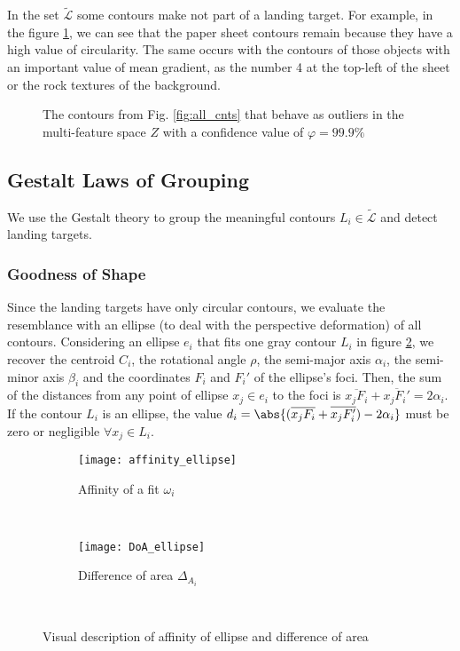 In the set $\widetilde{\mathcal{L}}$ some contours make not part of a landing target. For example, in the figure \ref{fig:rx_cnts}, we can see that the paper sheet contours remain because they have a high value of circularity. The same occurs with the contours of those objects with an important value of mean gradient, as the number 4 at the top-left of the sheet or the rock textures of the background.
\begin{figure}[h]
    \centering
    \caption{The contours from Fig. \ref{fig:all_cnts} that behave as outliers in the multi-feature space $Z$ with a confidence value of $\varphi=99.9\%$}
    \label{fig:rx_cnts}
\end{figure}

\subsection{Gestalt Laws of Grouping}\label{subsec:Gestalt}
We use the Gestalt theory \citep{Wertheimer:Psycologische:1923} to group the meaningful contours $L_{i}\in \widetilde{\mathcal{L}}$ and detect landing targets.

\subsubsection{Goodness of Shape}\label{subsec:similarity}
Since the landing targets have only circular contours, we evaluate the resemblance with an ellipse (to deal with the perspective deformation) of all contours. Considering an ellipse $e_{i}$ that fits one gray contour $L_{i}$ in figure \ref{fig:affinity}, we recover the centroid $C_{i}$, the rotational angle $\rho$, the semi-major axis $\alpha_i$, the semi-minor axis $\beta_{i}$ and the coordinates $F_{i}$ and $F_{i}'$ of the ellipse's foci. Then, the sum of the distances from any point of ellipse $x_{j}\in e_{i}$ to the foci is $\overline{x_{j}F_{i}}+\overline{x_{j}F_{i}'}=2\alpha_{i}$. If the contour $L_{i}$ is an ellipse, the value $d_{i}=\abs{(\overline{x_{j}F_{i}}+\overline{x_{j}F_{i}'})-2\alpha_{i} }$ must be zero or negligible $\forall x_{j}\in L_{i}$. 

\begin{figure}[h]
    \centering
    \begin{subfigure}[b]{0.4\textwidth}
        \texttt{[image: affinity\_ellipse]}
        \caption{Affinity of a fit $\omega_{i}$}
        \label{fig:affinity}
    \end{subfigure}
    ~ %
    \begin{subfigure}[b]{0.45\textwidth}
        \texttt{[image: DoA\_ellipse]}
        \caption{Difference of area $\Delta_{A_{i}}$}
        \label{fig:DoA}
    \end{subfigure}\\
    \caption{Visual description of affinity of ellipse and difference of area}\label{fig:ressemblance_ellipse}
\end{figure}

